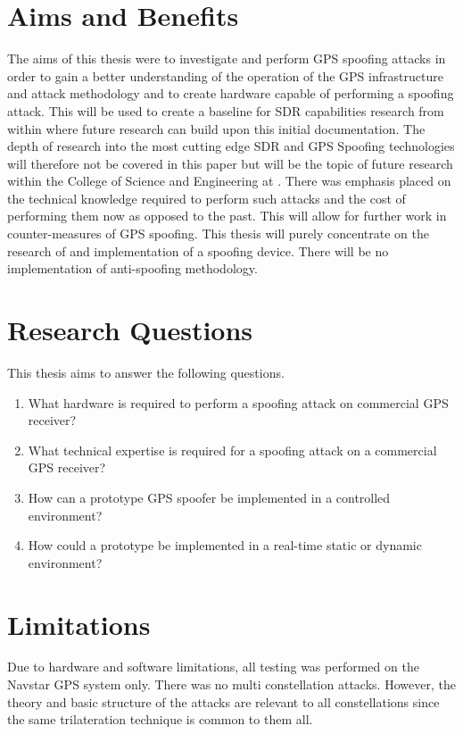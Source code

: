 \section{Aims and Benefits}\label{sec:Aims}
The aims of this thesis were to investigate and perform GPS spoofing attacks in order to gain a better understanding of the operation of the GPS infrastructure and attack
methodology and to create hardware capable of performing a spoofing attack. This will be used to create a baseline for SDR capabilities research from within \univname where future research can build upon this initial documentation.
The depth of research into the most cutting edge SDR and GPS Spoofing technologies will therefore not be covered in this paper but will be the topic of future research
within the College of Science and Engineering at \univname.
There was  emphasis placed on the technical knowledge required to perform such attacks and the cost of performing them now as opposed to the past. This will
allow for further work in counter-measures of GPS spoofing.
This thesis will purely concentrate on the research of and implementation of a spoofing device. There will be no implementation of anti-spoofing methodology.

\section{Research Questions}\label{sec:RQs}
This thesis aims to answer the following questions.
\begin{enumerate}
    \item What hardware is required to perform a spoofing attack on commercial GPS receiver?
    \item What technical expertise is required for a spoofing attack on a commercial GPS receiver?
    \item How can a prototype GPS spoofer be implemented in a controlled environment?
    \item How could a prototype be implemented in a real-time static or dynamic environment? 
\end{enumerate}

\section{Limitations}\label{sec:Limits}
Due to hardware and software limitations, all testing was performed on the Navstar GPS system only. There was no multi constellation attacks. However, the theory and basic
structure of the attacks are relevant to all constellations since the same trilateration technique is common to them all.

